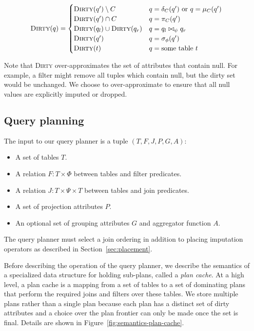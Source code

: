 \begin{align*}
  \textsc{Dirty}(q) = \begin{cases}
    \textsc{Dirty}(q') \setminus C & q = \delta_C(q')\ \text{or}\ q = \mu_C(q') \\
    \textsc{Dirty}(q') \cap C & q = \pi_C(q') \\
    \textsc{Dirty}(q_l) \cup \textsc{Dirty}(q_r) & q = q_l \bowtie_\psi q_r \\
    \textsc{Dirty}(q') & q = \sigma_\phi(q') \\
    \textsc{Dirty}(t) & q = \text{some table}\ t \\
  \end{cases}
\end{align*}

Note that \textsc{Dirty} over-approximates the set of attributes that contain null. For example, a filter might remove all tuples which contain null, but the dirty set would be unchanged. We choose to over-approximate to ensure that all null values are explicitly imputed or dropped.

\subsection{Query planning}
\label{sec:planning}
The input to our query planner is a tuple $(T, F, J, P, G, A)$:
\begin{itemize}
\item A set of tables $T$.
\item A relation $F: T \times \Phi$ between tables and filter predicates.
\item A relation $J : T \times \Psi \times T$ between tables and join predicates.
\item A set of projection attributes $P$.
\item An optional set of grouping attributes $G$ and aggregator function $A$.
\end{itemize}

The query planner must select a join ordering in addition to placing imputation operators as described in Section~\ref{sec:placement}.

Before describing the operation of the query planner, we describe the semantics of a specialized data structure for holding sub-plans, called a \emph{plan cache}.
At a high level, a plan cache is a mapping from a set of tables to a set of dominating plans that perform the required joins and filters over these tables.
We store multiple plans rather than a single plan because each plan has a distinct set of dirty attributes and a choice over the plan frontier
can only be made once the set is final. Details are shown in Figure~\ref{fig:semantics-plan-cache}.

